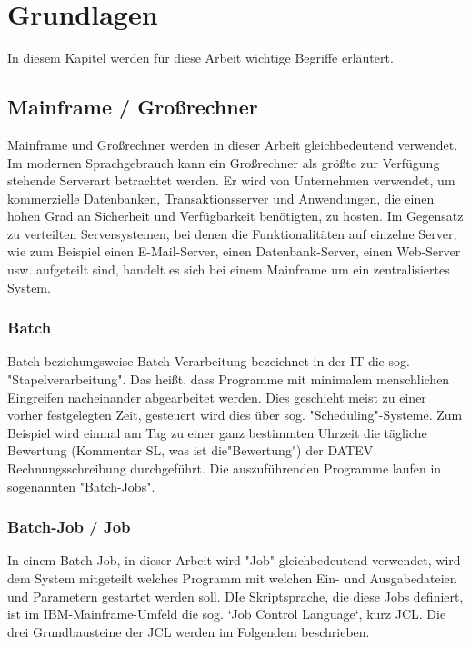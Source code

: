 \chapter{Grundlagen}\label{ch:grundlagen}
In diesem Kapitel werden für diese Arbeit wichtige Begriffe erläutert.

\section{Mainframe / Großrechner}\label{sec:mainframe}
Mainframe und Großrechner werden in dieser Arbeit gleichbedeutend verwendet.
Im modernen Sprachgebrauch kann ein Großrechner als größte zur Verfügung stehende Serverart betrachtet werden.
Er wird von Unternehmen verwendet, um  kommerzielle Datenbanken, Transaktionsserver und Anwendungen, die einen hohen Grad an Sicherheit und Verfügbarkeit benötigten, zu hosten.
Im Gegensatz zu verteilten Serversystemen, bei denen die Funktionalitäten auf einzelne Server, wie zum Beispiel einen E-Mail-Server, einen Datenbank-Server, einen Web-Server usw. aufgeteilt sind, handelt es sich bei einem Mainframe um ein zentralisiertes System.
\cite{Ebbers.2011}

\subsection{Batch}
Batch beziehungsweise Batch-Verarbeitung bezeichnet in der IT die sog. "Stapelverarbeitung".
Das heißt, dass Programme mit minimalem menschlichen Eingreifen nacheinander abgearbeitet werden.
Dies geschieht meist zu einer vorher festgelegten Zeit, gesteuert wird dies über sog. "Scheduling"-Systeme.
Zum Beispiel wird einmal am Tag zu einer ganz bestimmten Uhrzeit die tägliche Bewertung (Kommentar SL, was ist die"Bewertung") der DATEV Rechnungsschreibung durchgeführt.
Die auszuführenden Programme laufen in sogenannten "Batch-Jobs".
\cite{Ebbers.2011}

\subsection{Batch-Job / Job}\label{ssec:job}
In einem Batch-Job, in dieser Arbeit wird "Job" gleichbedeutend verwendet, wird dem System mitgeteilt welches Programm mit welchen Ein- und Ausgabedateien und Parametern gestartet werden soll.
DIe Skriptsprache, die diese Jobs definiert, ist im IBM-Mainframe-Umfeld die sog. `Job Control Language`, kurz JCL.
Die drei Grundbausteine der JCL werden im Folgendem beschrieben.

